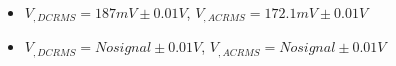 \begin{itemize}
     \item $V_{, DCRMS}=187mV\pm 0.01\unit{V}$, $V_{, ACRMS}=172.1mV\pm 0.01\unit{V}$ 
     \item $V_{, DCRMS}=No signal\pm 0.01\unit{V}$, $V_{, ACRMS}=No signal\pm 0.01\unit{V}$\\
\end{itemize}
